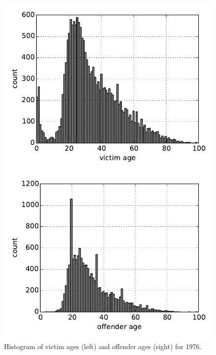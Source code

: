 \begin{figure}[H]
  \centering
  \begin{minipage}[b]{0.45\linewidth}
    \includegraphics[width=\linewidth]{images/victim_age.pdf}
  \end{minipage}
  \quad
  \begin{minipage}[b]{0.45\linewidth}
    \includegraphics[width=\linewidth]{images/offender_age.pdf}
  \end{minipage}
  \caption{Histogram of victim ages (left) and offender ages (right) for 1976.}
\end{figure}

